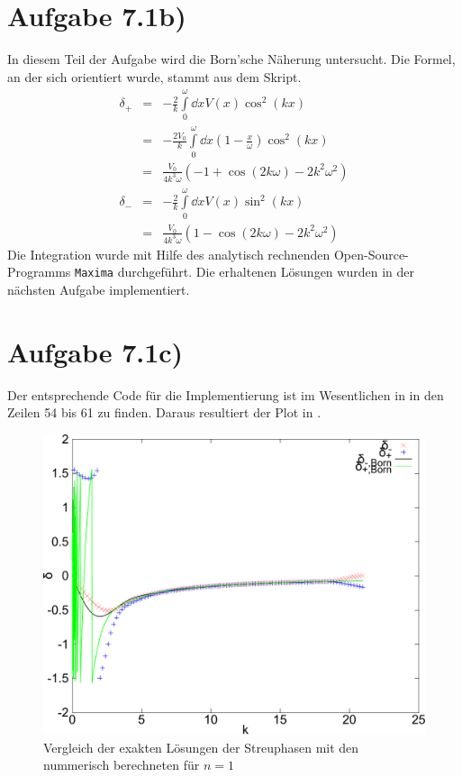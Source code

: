 \section*{Aufgabe 7.1b)}
In diesem Teil der Aufgabe wird die Born'sche Näherung untersucht. Die Formel, an
der sich orientiert wurde, stammt aus dem Skript.
\begin{eqnarray}
δ_+ &=& -\frac{2}{k}\int\limits_0^ω\dd{x}V(x)\cos^2(kx)\\
&=& -\frac{2 V_0}{k}\int\limits_0^ω\dd{x}(1-\frac{x}{ω})\cos^2(kx)\\
&=& \frac{V_0}{4k^3 ω} \left(-1 + \cos(2kω) - 2k^2 ω^2\right)\\
δ_- &=& -\frac{2}{k}\int\limits_0^ω\dd{x}V(x)\sin^2(kx)\\
&=& \frac{V_0}{4k^3 ω} \left(1 - \cos(2kω) - 2k^2 ω^2\right)
\end{eqnarray}
Die Integration wurde mit Hilfe des analytisch rechnenden Open-Source-Programms
\texttt{Maxima} durchgeführt. Die erhaltenen Lösungen wurden in der nächsten
Aufgabe implementiert.

\section*{Aufgabe 7.1c)}
Der entsprechende Code für die Implementierung ist im Wesentlichen in 
in den Zeilen 54 bis 61 zu finden. Daraus resultiert der Plot in .

\begin{figure}[htb]
  \centering
  \includegraphics[width=0.75\columnwidth,keepaspectratio]{../tmp/71c-crop}
  \caption{Vergleich der exakten Lösungen der Streuphasen mit den nummerisch
  berechneten für $n=1$}
  \label{fig:1c}
\end{figure}

